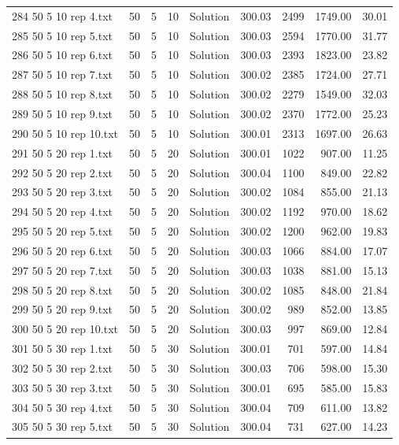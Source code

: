 \begin{longtable}{lrrllrrrr}
284 50 5 10 rep 4.txt & 50 & 5 & 10 & Solution & 300.03 & 2499 & 1749.00 & 30.01\\
285 50 5 10 rep 5.txt & 50 & 5 & 10 & Solution & 300.03 & 2594 & 1770.00 & 31.77\\
286 50 5 10 rep 6.txt & 50 & 5 & 10 & Solution & 300.03 & 2393 & 1823.00 & 23.82\\
287 50 5 10 rep 7.txt & 50 & 5 & 10 & Solution & 300.02 & 2385 & 1724.00 & 27.71\\
288 50 5 10 rep 8.txt & 50 & 5 & 10 & Solution & 300.02 & 2279 & 1549.00 & 32.03\\
289 50 5 10 rep 9.txt & 50 & 5 & 10 & Solution & 300.02 & 2370 & 1772.00 & 25.23\\
290 50 5 10 rep 10.txt & 50 & 5 & 10 & Solution & 300.01 & 2313 & 1697.00 & 26.63\\
291 50 5 20 rep 1.txt & 50 & 5 & 20 & Solution & 300.01 & 1022 & 907.00 & 11.25\\
292 50 5 20 rep 2.txt & 50 & 5 & 20 & Solution & 300.04 & 1100 & 849.00 & 22.82\\
293 50 5 20 rep 3.txt & 50 & 5 & 20 & Solution & 300.02 & 1084 & 855.00 & 21.13\\
294 50 5 20 rep 4.txt & 50 & 5 & 20 & Solution & 300.02 & 1192 & 970.00 & 18.62\\
295 50 5 20 rep 5.txt & 50 & 5 & 20 & Solution & 300.02 & 1200 & 962.00 & 19.83\\
296 50 5 20 rep 6.txt & 50 & 5 & 20 & Solution & 300.03 & 1066 & 884.00 & 17.07\\
297 50 5 20 rep 7.txt & 50 & 5 & 20 & Solution & 300.03 & 1038 & 881.00 & 15.13\\
298 50 5 20 rep 8.txt & 50 & 5 & 20 & Solution & 300.02 & 1085 & 848.00 & 21.84\\
299 50 5 20 rep 9.txt & 50 & 5 & 20 & Solution & 300.02 & 989 & 852.00 & 13.85\\
300 50 5 20 rep 10.txt & 50 & 5 & 20 & Solution & 300.03 & 997 & 869.00 & 12.84\\
301 50 5 30 rep 1.txt & 50 & 5 & 30 & Solution & 300.01 & 701 & 597.00 & 14.84\\
302 50 5 30 rep 2.txt & 50 & 5 & 30 & Solution & 300.03 & 706 & 598.00 & 15.30\\
303 50 5 30 rep 3.txt & 50 & 5 & 30 & Solution & 300.01 & 695 & 585.00 & 15.83\\
304 50 5 30 rep 4.txt & 50 & 5 & 30 & Solution & 300.04 & 709 & 611.00 & 13.82\\
305 50 5 30 rep 5.txt & 50 & 5 & 30 & Solution & 300.04 & 731 & 627.00 & 14.23\\

\end{longtable}

